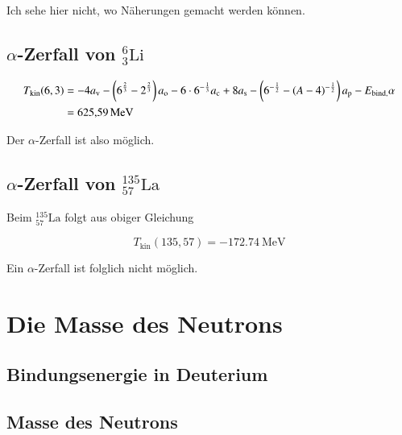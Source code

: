 Ich sehe hier nicht, wo Näherungen gemacht werden können.

\subsection{$\alpha$-Zerfall von $_3^6\text{Li}$}

\begin{align*}
    T_\text{kin}(6,3) &= -4a_\text{v}-\del{6^{\frac23}-2^{\frac23}}a_\text{o}
    -6\cdot6^{-\frac13}a_\text{c}+8a_\text{s}-\del{6^{-\half}-
    \del{A-4}^{-\half}}a_\text{p}-E_\text{bind,}\alpha \\
    &= \SI{625.59}{\mega\electronvolt}
\end{align*}

Der $\alpha$-Zerfall ist also möglich.

\subsection{$\alpha$-Zerfall von $_{57}^{135}\text{La}$}

Beim $_{57}^{135}\text{La}$ folgt aus obiger Gleichung

\[
    T_\text{kin}(135,57) = \SI{-172.74}{\mega\electronvolt}
\]

Ein $\alpha$-Zerfall ist folglich nicht möglich.


\section{Die Masse des Neutrons}
\subsection{Bindungsenergie in Deuterium}
\subsection{Masse des Neutrons}


